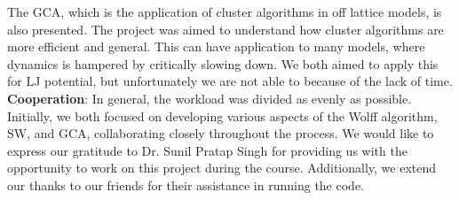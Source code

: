 \documentclass[a4paper,8pt]{article}
\begin{document}
The GCA, which is the application of cluster algorithms in off lattice models, is also presented. The project was aimed to understand how cluster algorithms are more efficient and general. This can have application to many models, where dynamics is hampered by critically slowing down. We both aimed to apply this for LJ potential, but unfortunately we are not able to because of the lack of time.  \\

\textbf{Cooperation}: In general, the workload was divided as evenly as possible. Initially, we both focused on developing various aspects of the Wolff algorithm, SW, and GCA, collaborating closely throughout the process. We would like to express our gratitude to Dr. Sunil Pratap Singh for providing us with the opportunity to work on this project during the course. Additionally, we extend our thanks to our friends for their assistance in running the code.






\newpage 
\clearpage
\printbibliography[title=\centering Bibliography]
\end{document}
